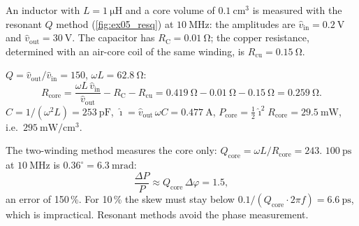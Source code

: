 

An inductor with $L=\SI{1}{\micro\henry}$ and a core volume of $\SI{0.1}{\centi\metre\cubed}$ is measured with the resonant $Q$ method (\autoref{fig:ex05_resq}) at $\SI{10}{\mega\hertz}$: the amplitudes are $\hat{v}_\mathrm{in}=\SI{0.2}{\volt}$ and $\hat{v}_\mathrm{out}=\SI{30}{\volt}$. The capacitor has $R_\mathrm{C}=\SI{0.01}{\ohm}$; the copper resistance, determined with an air-core coil of the same winding, is $R_\mathrm{cu}=\SI{0.15}{\ohm}$.




\begin{solutionblock}
	$Q=\hat{v}_\mathrm{out}/\hat{v}_\mathrm{in}=150$, $\omega L=\SI{62.8}{\ohm}$:
	\begin{equation}
		R_\mathrm{core}=\frac{\omega L\,\hat{v}_\mathrm{in}}{\hat{v}_\mathrm{out}}-R_\mathrm{C}-R_\mathrm{cu}=\SI{0.419}{\ohm}-\SI{0.01}{\ohm}-\SI{0.15}{\ohm}=\SI{0.259}{\ohm}.
	\end{equation}
	$C=1/(\omega^2L)=\SI{253}{\pico\farad}$, $\hat{\imath}=\hat{v}_\mathrm{out}\,\omega C=\SI{0.477}{\ampere}$, $P_\mathrm{core}=\frac12\hat{\imath}^2R_\mathrm{core}=\SI{29.5}{\milli\watt}$, i.e.\ $\SI{295}{\milli\watt\per\centi\metre\cubed}$.
\end{solutionblock}


\begin{solutionblock}
	The two-winding method measures the core only: $Q_\mathrm{core}=\omega L/R_\mathrm{core}=243$. $\SI{100}{\pico\second}$ at $\SI{10}{\mega\hertz}$ is $0.36^\circ=\SI{6.3}{\milli\radian}$:
	\begin{equation}
		\frac{\Delta P}{P}\approx Q_\mathrm{core}\,\Delta\varphi=1.5,
	\end{equation}
	an error of 150\,\%. For 10\,\% the skew must stay below $0.1/(Q_\mathrm{core}\cdot2\pi f)=\SI{6.6}{\pico\second}$, which is impractical. Resonant methods avoid the phase measurement.
\end{solutionblock}

